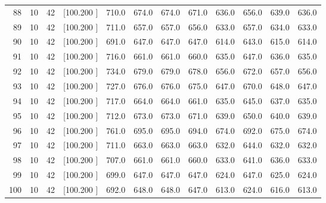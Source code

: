 \documentclass[12pt,a4paper]{article}
\begin{document}
\begin{center}
{\begin{tabular}{r r r r r r r r r r r r}
  88& 10& 42&[100.200   ]&   710.0&   674.0&   674.0&   671.0&   636.0&   656.0&   639.0&   636.0\\[-0.02in]
  89& 10& 42&[100.200   ]&   711.0&   657.0&   657.0&   656.0&   633.0&   657.0&   634.0&   633.0\\[-0.02in]
  90& 10& 42&[100.200   ]&   691.0&   647.0&   647.0&   647.0&   614.0&   643.0&   615.0&   614.0\\[-0.02in]
  91& 10& 42&[100.200   ]&   716.0&   661.0&   661.0&   660.0&   635.0&   647.0&   636.0&   635.0\\[-0.02in]
  92& 10& 42&[100.200   ]&   734.0&   679.0&   679.0&   678.0&   656.0&   672.0&   657.0&   656.0\\[-0.02in]
  93& 10& 42&[100.200   ]&   727.0&   676.0&   676.0&   675.0&   647.0&   670.0&   648.0&   647.0\\[-0.02in]
  94& 10& 42&[100.200   ]&   717.0&   664.0&   664.0&   661.0&   635.0&   645.0&   637.0&   635.0\\[-0.02in]
  95& 10& 42&[100.200   ]&   712.0&   673.0&   673.0&   671.0&   639.0&   650.0&   640.0&   639.0\\[-0.02in]
  96& 10& 42&[100.200   ]&   761.0&   695.0&   695.0&   694.0&   674.0&   692.0&   675.0&   674.0\\[-0.02in]
  97& 10& 42&[100.200   ]&   711.0&   663.0&   663.0&   663.0&   632.0&   644.0&   632.0&   632.0\\[-0.02in]
  98& 10& 42&[100.200   ]&   707.0&   661.0&   661.0&   660.0&   633.0&   641.0&   636.0&   633.0\\[-0.02in]
  99& 10& 42&[100.200   ]&   699.0&   647.0&   647.0&   647.0&   624.0&   647.0&   625.0&   624.0\\[-0.02in]
 100& 10& 42&[100.200   ]&   692.0&   648.0&   648.0&   647.0&   613.0&   624.0&   616.0&   613.0\\[-0.02in]

\hline
\end{tabular}}
\end{center}
\end{document}
